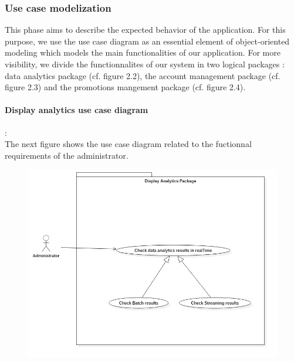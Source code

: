 \subsubsection{Use case modelization}
\label{sec:sec01}
This phase aims to describe the expected behavior of the application. 
For this purpose, we use the use case diagram as an essential element of object-oriented modeling which models the main functionalities 
of our application. For more visibility, we divide the functionnalites of our system in two logical packages : data analytics package (cf. figure 2.2), 
the account management package (cf. figure 2.3) and the promotions mangement package (cf. figure 2.4).
\paragraph{Display analytics use case diagram} :\\
The next figure shows the use case diagram related to the fuctionnal requirements of the administrator.
\label{sec:sec01}
\begin{figure}[H]
	\centering
	\includegraphics[height=0.4\textheight]{fig01/DataAnalyticsUseCasediagram}
	\label{fig:FilialesEtClients}
\end{figure}

